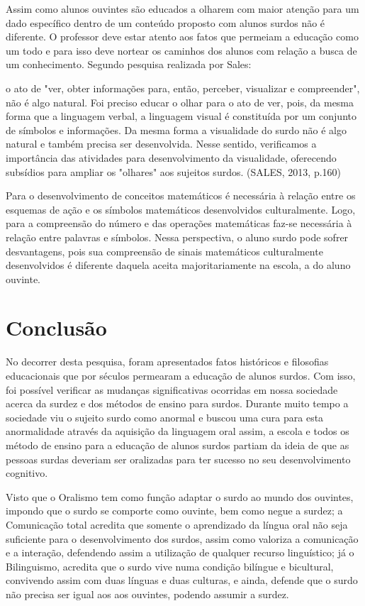 \documentclass[brasil]{abnt}
\begin{document}
	Assim como alunos ouvintes são educados a olharem com maior atenção para um dado específico dentro de um conteúdo proposto com alunos surdos não é diferente. O professor deve estar atento aos fatos que permeiam a educação como um todo e para isso 
	deve nortear os caminhos dos alunos com relação a busca de um conhecimento. Segundo pesquisa realizada por Sales:
	
			\begin{citacao} [...] o ato de "ver, obter informações para, então, perceber, visualizar e compreender", não é algo natural. Foi preciso educar o olhar para o ato de ver, pois, da mesma forma que a linguagem verbal, 
							a linguagem visual é constituída por um conjunto de símbolos e informações. Da mesma forma a visualidade do surdo não é algo natural e também precisa ser desenvolvida. Nesse sentido, verificamos
							a importância das atividades para desenvolvimento da visualidade, oferecendo subsídios para ampliar os "olhares" aos sujeitos surdos. (SALES, 2013, p.160) 
			\end{citacao}
	
	Para o desenvolvimento de conceitos matemáticos é necessária à relação entre os esquemas de ação e os símbolos matemáticos desenvolvidos culturalmente. Logo, para a compreensão do número e das operações 
	matemáticas faz-se necessária à relação entre palavras e símbolos. Nessa perspectiva, o aluno surdo pode sofrer desvantagens, pois sua compreensão de sinais matemáticos culturalmente desenvolvidos é 
	diferente daquela aceita majoritariamente na escola, a do aluno ouvinte.

\chapter*{Conclusão}  

	No decorrer desta pesquisa, foram apresentados fatos históricos e filosofias educacionais que por séculos permearam a educação de alunos surdos. Com isso, foi possível verificar as mudanças
	significativas ocorridas em nossa sociedade acerca da surdez e dos métodos de ensino para surdos. Durante muito tempo a sociedade viu o sujeito surdo como anormal e buscou uma cura para esta anormalidade
	através da aquisição da linguagem oral assim, a escola e todos os método de ensino para a educação de alunos surdos partiam da ideia de que as pessoas surdas deveriam ser oralizadas para ter sucesso no seu 
	desenvolvimento cognitivo.  

	Visto que o Oralismo tem como função adaptar o surdo ao mundo dos ouvintes, impondo que o surdo se comporte como ouvinte, bem como negue a surdez;
	a Comunicação total acredita que somente o aprendizado da língua oral não seja suficiente para o desenvolvimento dos surdos, assim como valoriza a comunicação e a interação, defendendo assim a utilização de qualquer recurso linguístico; 
	já o Bilinguismo, acredita que o surdo vive numa condição bilíngue e bicultural, convivendo assim com duas línguas e duas culturas, e ainda, defende que o surdo não precisa ser igual aos aos ouvintes, 
	podendo assumir a surdez. 
	
\end{document}
